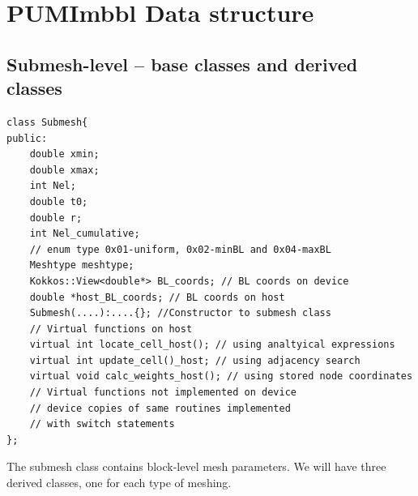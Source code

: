 \documentclass[a4paper,12pt]{article}
\begin{document}
\section{PUMImbbl Data structure}

\subsection{Submesh-level -- base classes and derived classes}
\begin{lstlisting}
class Submesh{
public:
    double xmin;
    double xmax;
    int Nel;
    double t0;
    double r;
    int Nel_cumulative;
    // enum type 0x01-uniform, 0x02-minBL and 0x04-maxBL
    Meshtype meshtype; 
    Kokkos::View<double*> BL_coords; // BL coords on device
    double *host_BL_coords; // BL coords on host
    Submesh(....):....{}; //Constructor to submesh class
    // Virtual functions on host
    virtual int locate_cell_host(); // using analtyical expressions 
    virtual int update_cell()_host; // using adjacency search
    virtual void calc_weights_host(); // using stored node coordinates
    // Virtual functions not implemented on device
    // device copies of same routines implemented 
    // with switch statements
};
\end{lstlisting}
The submesh class contains block-level mesh parameters. We will have three derived classes, one for each type of meshing.\\
\end{document}
